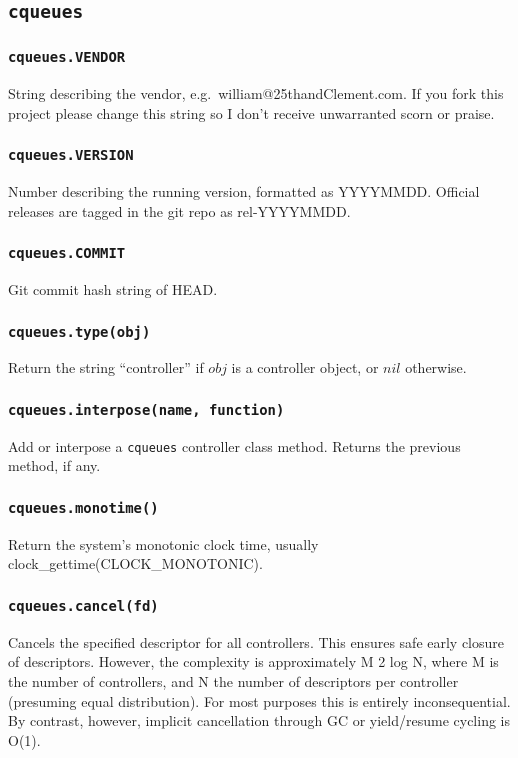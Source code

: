 \documentclass[11pt, oneside]{memoir}
\newcommand{\cqueues}[0]{\texttt{cqueues} }
\newcommand{\routine}[1]{\texttt{#1} }
\newcounter{toccols}
\newenvironment{Module}[1]{
	\subsection{\texttt{#1}}
	\addtocontents{toc}{
		\protect\begin{multicols}{\value{toccols}}
	}
}{
	\addtocontents{toc}{\protect\end{multicols}}
}
\begin{document}
\begin{Module}{\cqueues}

\subsubsection{\routine{cqueues.VENDOR}}
String describing the vendor, e.g.\ william@25thandClement.com. If you fork this project please change this string so I don't receive unwarranted scorn or praise.

\subsubsection{\routine{cqueues.VERSION}}
Number describing the running version, formatted as YYYYMMDD. Official releases are tagged in the git repo as rel-YYYYMMDD.

\subsubsection{\routine{cqueues.COMMIT}}
Git commit hash string of HEAD.

\subsubsection[\routine{cqueues.type}]{\routine{cqueues.type(obj)}}
Return the string ``controller'' if $obj$ is a controller object, or $nil$ otherwise.

\subsubsection[\routine{cqueues.interpose}]{\routine{cqueues.interpose(name, function)}}
Add or interpose a \cqueues controller class method. Returns the previous method, if any.

\subsubsection[\routine{cqueues.monotime}]{\routine{cqueues.monotime()}}
Return the system's monotonic clock time, usually clock\_gettime(CLOCK\_MONOTONIC).

\subsubsection[\routine{cqueues.cancel}]{\routine{cqueues.cancel(fd)}}
Cancels the specified descriptor for all controllers. This ensures safe early closure of descriptors. However, the complexity is approximately M 2 log N, where M is the number of controllers, and N the number of descriptors per controller (presuming equal distribution). For most purposes this is entirely inconsequential. By contrast, however, implicit cancellation through GC or yield/resume cycling is O(1).


\end{Module}
\end{document}

